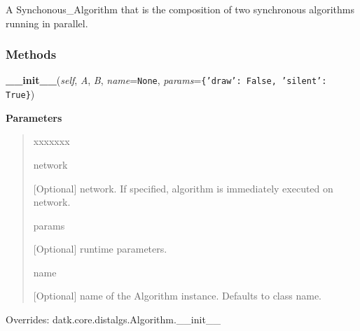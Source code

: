 A Synchonous\_Algorithm that is the composition of two synchronous 
algorithms running in parallel.



  \subsubsection{Methods}

    \vspace{0.5ex}

\hspace{.8\funcindent}\begin{boxedminipage}{\funcwidth}

    \raggedright \textbf{\_\_init\_\_}(\textit{self}, \textit{A}, \textit{B}, \textit{name}={\tt None}, \textit{params}={\tt \texttt{\{}\texttt{'}\texttt{draw}\texttt{'}\texttt{: }False\texttt{, }\texttt{'}\texttt{silent}\texttt{'}\texttt{: }True\texttt{\}}})

\setlength{\parskip}{2ex}
\setlength{\parskip}{1ex}
      \textbf{Parameters}
      \vspace{-1ex}

      \begin{quote}
        \begin{Ventry}{xxxxxxx}

          \item[network]

          [Optional] network. If specified, algorithm is immediately 
          executed on network.

          \item[params]

          [Optional] runtime parameters.

          \item[name]

          [Optional] name of the Algorithm instance. Defaults to class 
          name.

        \end{Ventry}

      \end{quote}

      Overrides: datk.core.distalgs.Algorithm.\_\_init\_\_

    \end{boxedminipage}

